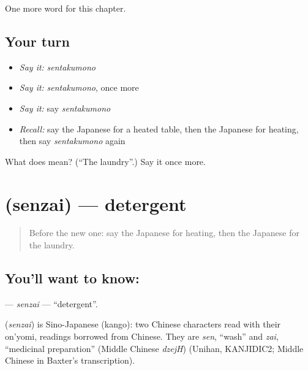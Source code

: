 \begin{grammarlens}[title={What you've built}]
One more word for this chapter.
\end{grammarlens}

\subsection*{Your turn}
\begin{itemize}
\raggedright
  \item \emph{Say it:} \emph{sentakumono}
  \item \emph{Say it:} \emph{sentakumono}, once more
  \item \emph{Say it:} say \emph{sentakumono}
  \item \emph{Recall:} say the Japanese for a heated table, then the Japanese for heating, then say \emph{sentakumono} again
\end{itemize}

\begin{tcolorbox}[breakable,colback=teal!4,colframe=teal!35!black,title={Before you move on}]
What does  mean? (\textquotedblleft{}The laundry\textquotedblright{}.) Say it once more.
\end{tcolorbox}
\section[\texorpdfstring{\ja{せんざい} (senzai)}{せんざい (senzai)}]{ (senzai) — detergent}

\label{lesson:JA-C102-senzai}



\begin{quote}
Before the new one: say the Japanese for heating, then the Japanese for the laundry.
\end{quote}

\subsection*{You'll want to know: }
\textbf{} — \emph{senzai} — \textquotedblleft{}detergent\textquotedblright{}.

\begin{cousinweb}
\textbf{} (\emph{senzai}) is Sino-Japanese (kango): two Chinese characters read with their on'yomi, readings borrowed from Chinese. They are \emph{sen}, \textquotedblleft{}wash\textquotedblright{} and \emph{zai}, \textquotedblleft{}medicinal preparation\textquotedblright{} (Middle Chinese \emph{dzejH}) (Unihan, KANJIDIC2; Middle Chinese in Baxter's transcription).
\end{cousinweb}

